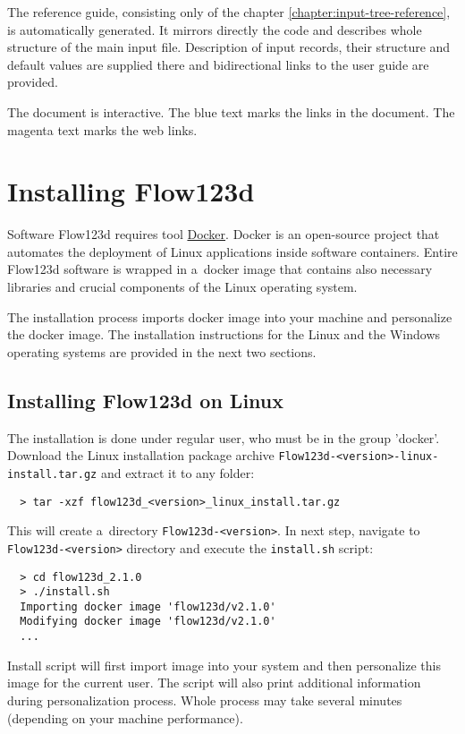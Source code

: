 The reference guide, consisting only of the chapter \ref{chapter:input-tree-reference}, is automatically
generated. It mirrors directly the code and describes whole structure of the main input file. Description
of input records, their structure and default values are supplied there and bidirectional links to the user 
guide are provided.

The document is interactive. The blue text marks the links in the document. The magenta text marks the web links.

\section{Installing Flow123d}
Software Flow123d requires tool \href{https://www.docker.com}{Docker}. 
Docker is an open-source project that automates the deployment of Linux applications inside software containers. 
Entire Flow123d software is wrapped in a~docker image that contains also necessary libraries and crucial components 
of the Linux operating system.

The installation process imports docker image into your machine and personalize the docker image. The installation 
instructions for the Linux and the Windows operating systems are provided in the next two sections.

\subsection{Installing Flow123d on Linux}
The installation is done under regular user, who must be in the group 'docker'.
Download the Linux installation package archive \verb'Flow123d-<version>-linux-install.tar.gz' and extract it to any folder:
\begin{verbatim}
  > tar -xzf flow123d_<version>_linux_install.tar.gz 
\end{verbatim}
This will create a~directory \verb'Flow123d-<version>'. In next step, navigate to \verb'Flow123d-<version>' directory
and execute the \verb'install.sh' script:
\begin{verbatim}
  > cd flow123d_2.1.0
  > ./install.sh
  Importing docker image 'flow123d/v2.1.0'
  Modifying docker image 'flow123d/v2.1.0'
  ...
\end{verbatim}
Install script will first import image into your system and then personalize this image for the current user. The script will also print
additional information during personalization process. Whole process may take several minutes (depending on your machine performance).


